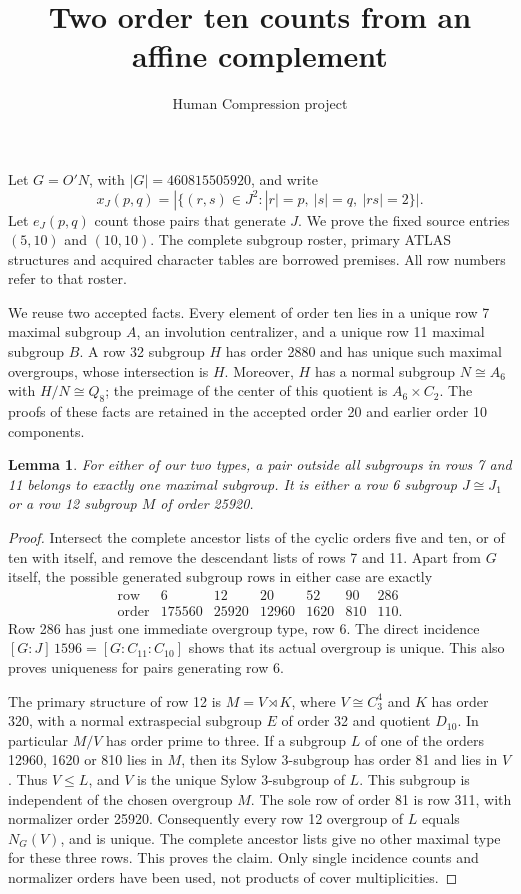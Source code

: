 \documentclass[11pt,a4paper]{article}
\title{Two order ten counts from an affine complement}
\author{Human Compression project}\date{}
\newtheorem{lemma}{Lemma}\newtheorem{theorem}{Theorem}
\begin{document}
\maketitle
Let $G=O'N$, with $|G|=460815505920$, and write
\[
 x_J(p,q)=|\{(r,s)\in J^2:|r|=p,\ |s|=q,\ |rs|=2\}|.
\]
Let $e_J(p,q)$ count those pairs that generate $J$. We prove the
fixed source entries $(5,10)$ and $(10,10)$. The complete subgroup
roster, primary ATLAS structures and acquired character tables are
borrowed premises. All row numbers refer to that roster.

We reuse two accepted facts. Every element of order ten lies in a
unique row 7 maximal subgroup $A$, an involution centralizer, and a
unique row 11 maximal subgroup $B$. A row 32 subgroup $H$ has order
2880 and has unique such maximal overgroups, whose intersection is
$H$. Moreover, $H$ has a normal subgroup $N\cong A_6$ with
$H/N\cong Q_8$; the preimage of the center of this quotient is
$A_6\times C_2$. The proofs of these facts are retained in the
accepted order 20 and earlier order 10 components.

\begin{lemma}\label{cover}
For either of our two types, a pair outside all subgroups in rows 7
and 11 belongs to exactly one maximal subgroup. It is either a
row 6 subgroup $J\cong J_1$ or a row 12 subgroup $M$ of order 25920.
\end{lemma}
\begin{proof}
Intersect the complete ancestor lists of the cyclic orders five
and ten, or of ten with itself, and remove the descendant lists of
rows 7 and 11. Apart from $G$ itself, the possible generated
subgroup rows in either case are exactly
\[
 \begin{array}{c|rrrrrr}
 \text{row}&6&12&20&52&90&286\\
 \text{order}&175560&25920&12960&1620&810&110.
 \end{array}
\]
Row 286 has just one immediate overgroup type, row 6. The direct
incidence $[G:J]\,1596=[G:C_{11}:C_{10}]$ shows that its actual
overgroup is unique. This also proves uniqueness for pairs
generating row 6.

The primary structure of row 12 is $M=V\rtimes K$, where
$V\cong C_3^4$ and $K$ has order 320, with a normal extraspecial
subgroup $E$ of order 32 and quotient $D_{10}$. In particular
$M/V$ has order prime to three. If a subgroup $L$ of one of the
orders 12960, 1620 or 810 lies in $M$, then its Sylow 3-subgroup
has order 81 and lies in $V$. Thus $V\leq L$, and $V$ is the unique
Sylow 3-subgroup of $L$. This subgroup is independent of the
chosen overgroup $M$. The sole row of order 81 is row 311, with
normalizer order 25920. Consequently every row 12 overgroup of
$L$ equals $N_G(V)$, and is unique. The complete ancestor lists
give no other maximal type for these three rows. This proves the
claim. Only single incidence counts and normalizer orders have
been used, not products of cover multiplicities.
\end{proof}
\end{document}
